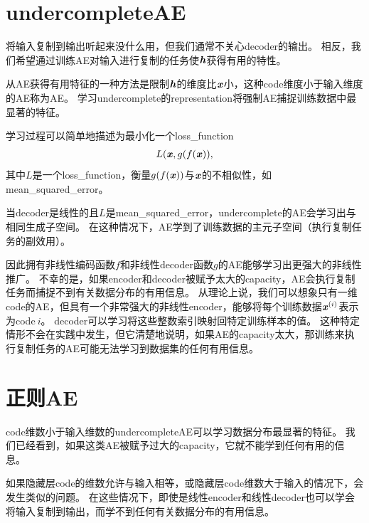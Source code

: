\section{\gls{undercomplete}\gls{AE}}
\label{sec:undercomplete_autoencoders}
将输入复制到输出听起来没什么用，但我们通常不关心\gls{decoder}的输出。
相反，我们希望通过训练\gls{AE}对输入进行复制的任务使$\boldsymbol{\mathit{h}}$获得有用的特性。


从\gls{AE}获得有用特征的一种方法是限制$\boldsymbol{\mathit{h}}$的维度比$\boldsymbol{\mathit{x}}$小，这种\gls{code}维度小于输入维度的\gls{AE}称为\gls{AE}。
学习\gls{undercomplete}的\gls{representation}将强制\gls{AE}捕捉训练数据中最显著的特征。


学习过程可以简单地描述为最小化一个\gls{loss_function} 
\begin{align}
L(\boldsymbol{\mathit{x}}, g(f(\boldsymbol{\mathit{x}})),
\end{align}
其中$L$是一个\gls{loss_function}，衡量$g(f(\boldsymbol{\mathit{x}}))$与$\boldsymbol{\mathit{x}}$的不相似性，如\gls{mean_squared_error}。


当\gls{decoder}是线性的且$L$是\gls{mean_squared_error}，\gls{undercomplete}的\gls{AE}会学习出与相同生成子空间。
在这种情况下，\gls{AE}学到了训练数据的主元子空间（执行复制任务的副效用）。


因此拥有非线性编码函数$f$和非线性\gls{decoder}函数$g$的\gls{AE}能够学习出更强大的非线性推广。
不幸的是，如果\gls{encoder}和\gls{decoder}被赋予太大的\gls{capacity}，\gls{AE}会执行复制任务而捕捉不到有关数据分布的有用信息。
从理论上说，我们可以想象只有一维\gls{code}的\gls{AE}，但具有一个非常强大的非线性\gls{encoder}，能够将每个训练数据$\boldsymbol{\mathit{x}}^{(i)}$表示为\gls{code}$~i$。
\gls{decoder}可以学习将这些整数索引映射回特定训练样本的值。
这种特定情形不会在实践中发生，但它清楚地说明，如果\gls{AE}的\gls{capacity}太大，那训练来执行复制任务的\gls{AE}可能无法学习到数据集的任何有用信息。


\section{正则\gls{AE}}
\label{sec:regularized_autoencoders}
\gls{code}维数小于输入维数的\gls{undercomplete}\gls{AE}可以学习数据分布最显著的特征。
我们已经看到，如果这类\gls{AE}被赋予过大的\gls{capacity}，它就不能学到任何有用的信息。


如果隐藏层\gls{code}的维数允许与输入相等，或隐藏层\gls{code}维数大于输入的情况下，会发生类似的问题。
在这些情况下，即使是线性\gls{encoder}和线性\gls{decoder}也可以学会将输入复制到输出，而学不到任何有关数据分布的有用信息。


